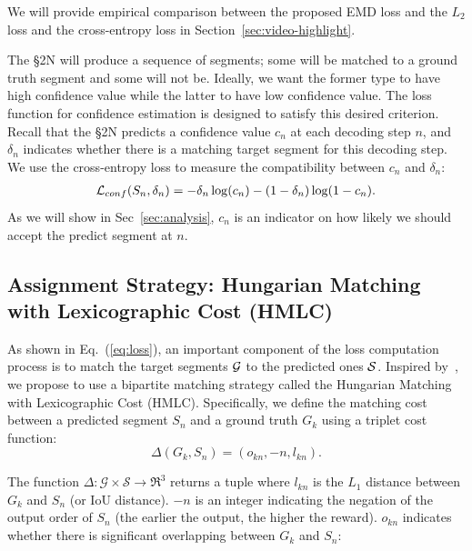 \documentclass[10pt,journal,compsoc]{IEEEtran}
\begin{document}
We will provide empirical comparison between the proposed EMD loss and the $L_2$ loss and the  cross-entropy loss in Section~\ref{sec:video-highlight}.

 The \S2N will produce a sequence of segments; some will be matched to a ground truth segment and some will not be. Ideally, we want the former type to have high confidence value while the latter to have low confidence value. The loss function for confidence estimation is designed to satisfy this desired criterion. 
Recall that the \S2N predicts a confidence value $c_n$ at each decoding step $n$, and $\delta_n$ indicates whether there is a matching target segment for this decoding step. We use the cross-entropy loss to measure the compatibility between $c_n$ and $\delta_n$: 
\begin{align}
\mathcal{L}_{conf}(S_n, \delta_n) = - \delta_n\log(c_n) -  (1- \delta_n)\log(1 - c_n).
\end{align}
As we will show in Sec~\ref{sec:analysis}, $c_n$ is an indicator on how likely we should accept the predict segment at $n$.
 


\subsection{Assignment Strategy: Hungarian Matching with Lexicographic Cost (HMLC)~\label{sec:HMLC}} 

As shown in Eq.~(\ref{eq:loss}), an important component of the loss computation process is to match the target segments $\mathcal{G}$ to the predicted ones $\mathcal{S}$. Inspired by~\cite{stewart2016end}, we propose to use a bipartite matching strategy called the Hungarian Matching with Lexicographic Cost (HMLC). Specifically, we define the matching cost between a predicted segment $S_n$ and a ground truth $G_k$ using a triplet cost function:
\begin{equation}
\Delta (G_k, S_n) = (o_{kn}, -n, l_{kn}).\label{eq:assign}
\end{equation}

The function $\Delta: \mathcal{G} \times \mathcal{S} \rightarrow \Re^3$ returns a tuple where $l_{kn}$ is the $L_1$ distance between $G_k$ and $S_n$ (or IoU distance). $-n$ is an integer indicating the negation of the output order of $S_n$ (the earlier the output, the higher the reward).
$o_{kn}$ indicates whether there is significant overlapping between $G_k$ and $S_n$: 
\end{document}

